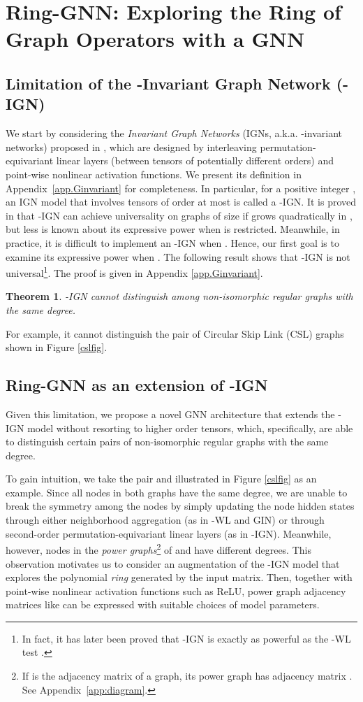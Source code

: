 \documentclass{article}
\newtheorem{theorem}{Theorem}
\begin{document}
\section{Ring-GNN: Exploring the Ring of Graph Operators with a GNN}
\subsection{Limitation of the -Invariant Graph Network (-IGN)}
We start by considering the \emph{Invariant Graph Networks} (IGNs, a.k.a. -invariant networks) proposed in \cite{maron2019universality}, which are designed by interleaving permutation-equivariant linear layers (between tensors of potentially different orders) and point-wise nonlinear activation functions.
We present its definition in Appendix~\ref{app.Ginvariant} for completeness. In particular, for a positive integer , an IGN model that involves tensors of order at most  is called a -IGN.
It is proved in \cite{maron2019universality} that -IGN can achieve universality on graphs of size  if  grows quadratically in , but less is known about its expressive power when  is restricted. Meanwhile, in practice, it is difficult to implement an -IGN when . Hence, our first goal is to examine its expressive power when .
The following result shows that -IGN is not universal\footnote{In fact, it has later been proved that -IGN is exactly as powerful as the -WL test \cite{chen2020can, geerts2020expressive, geerts2022expressiveness}.}. The proof is given in Appendix \ref{app.Ginvariant}. 
\begin{theorem} \label{prop.Ginvariant}
-IGN cannot distinguish among non-isomorphic regular graphs with the same degree.
\end{theorem}
For example, it cannot distinguish the pair of Circular Skip Link (CSL) graphs shown in Figure \ref{cslfig}.
\subsection{Ring-GNN as an extension of -IGN}
\label{sec:ringgnn}
Given this limitation, we propose a novel GNN architecture that extends the -IGN model without resorting to higher order tensors, which, specifically, are able to distinguish certain pairs of non-isomorphic regular graphs with the same degree. 

To gain intuition, we take 
the pair  and  illustrated in Figure \ref{cslfig}
as an example.
Since all nodes in both graphs have the same degree, we are unable to break the symmetry among the nodes by simply updating the node hidden states through either neighborhood aggregation (as in -WL and GIN) or through second-order permutation-equivariant linear layers (as in -IGN). Meanwhile, however, nodes in the \textit{power graphs}\footnote{If  is the adjacency matrix of a graph, its power graph has adjacency matrix . See Appendix~\ref{app:diagram}.} of  and  have different degrees.
This observation motivates us to consider an augmentation of the -IGN model that explores the polynomial \emph{ring} generated by the input matrix.
Then, together with point-wise nonlinear activation functions such as ReLU, power graph adjacency matrices like  can be expressed with suitable choices of model parameters. 
\end{document}
